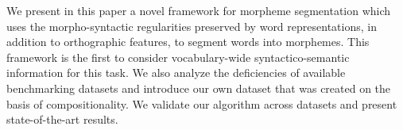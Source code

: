 We present in this paper a novel framework for morpheme segmentation which uses the morpho-syntactic regularities preserved by word representations, in addition to orthographic features, to segment words into morphemes. This framework is the first to consider vocabulary-wide syntactico-semantic information for this task. We also analyze the deficiencies  of  available benchmarking datasets and introduce our own dataset that was created on the basis of compositionality.  We validate our algorithm across datasets and present state-of-the-art results.
